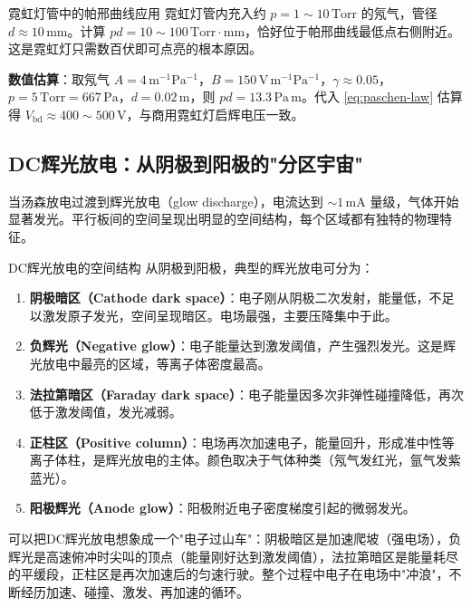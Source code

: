 \begin{example}{霓虹灯管中的帕邢曲线应用}{}{}
\label{ex:neon-paschen}
霓虹灯管内充入约 $p = 1\sim 10\,\mathrm{Torr}$ 的氖气，管径 $d \approx 10\,\mathrm{mm}$。计算 $pd = 10\sim 100\,\mathrm{Torr\cdot mm}$，恰好位于帕邢曲线最低点右侧附近。这是霓虹灯只需数百伏即可点亮的根本原因。

\textbf{数值估算}：取氖气 $A = 4\,\mathrm{m^{-1}Pa^{-1}}$，$B = 150\,\mathrm{V\,m^{-1}Pa^{-1}}$，$\gamma \approx 0.05$，$p = 5\,\mathrm{Torr} = 667\,\mathrm{Pa}$，$d = 0.02\,\mathrm{m}$，则 $pd = 13.3\,\mathrm{Pa\,m}$。代入 \cref{eq:paschen-law} 估算得 $V_{\text{bd}} \approx 400\sim 500\,\mathrm{V}$，与商用霓虹灯启辉电压一致。
\end{example}

\subsection{DC辉光放电：从阴极到阳极的"分区宇宙"}

当汤森放电过渡到辉光放电（glow discharge），电流达到 $\sim 1\,\mathrm{mA}$ 量级，气体开始显著发光。平行板间的空间呈现出明显的空间结构，每个区域都有独特的物理特征。

\begin{definition}{DC辉光放电的空间结构}{}{}
\label{def:glow-regions}
从阴极到阳极，典型的辉光放电可分为：
\begin{enumerate}
\item \textbf{阴极暗区（Cathode dark space）}：电子刚从阴极二次发射，能量低，不足以激发原子发光，空间呈现暗区。电场最强，主要压降集中于此。
\item \textbf{负辉光（Negative glow）}：电子能量达到激发阈值，产生强烈发光。这是辉光放电中最亮的区域，等离子体密度最高。
\item \textbf{法拉第暗区（Faraday dark space）}：电子能量因多次非弹性碰撞降低，再次低于激发阈值，发光减弱。
\item \textbf{正柱区（Positive column）}：电场再次加速电子，能量回升，形成准中性等离子体柱，是辉光放电的主体。颜色取决于气体种类（氖气发红光，氩气发紫蓝光）。
\item \textbf{阳极辉光（Anode glow）}：阳极附近电子密度梯度引起的微弱发光。
\end{enumerate}
\end{definition}

\begin{insight}{}{}
可以把DC辉光放电想象成一个"电子过山车"：阴极暗区是加速爬坡（强电场），负辉光是高速俯冲时尖叫的顶点（能量刚好达到激发阈值），法拉第暗区是能量耗尽的平缓段，正柱区是再次加速后的匀速行驶。整个过程中电子在电场中"冲浪"，不断经历加速、碰撞、激发、再加速的循环。
\end{insight}

